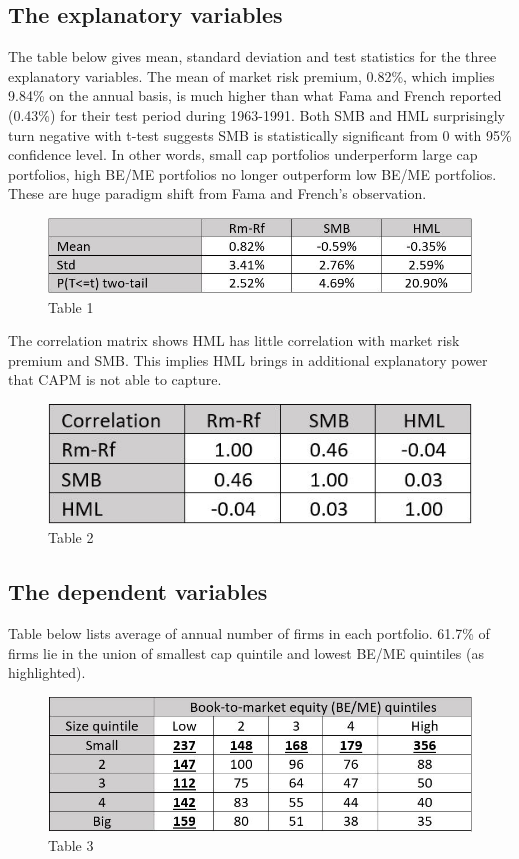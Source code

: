 \documentclass[12pt]{article}
\begin{document}
\subsection{The explanatory variables}

The table below gives mean, standard deviation and test statistics for the three explanatory variables. The mean of market risk premium, 0.82\%, which implies 9.84\% on the annual basis, is much higher than what Fama and French reported (0.43\%) for their test period during 1963-1991. Both SMB and HML surprisingly turn negative with t-test suggests SMB is statistically significant from 0 with 95\% confidence level. In other words, small cap portfolios underperform large cap portfolios, high BE/ME portfolios no longer outperform low BE/ME portfolios. These are huge paradigm shift from Fama and French’s observation.


\begin{figure}[h]
	\centering
	\includegraphics[width=0.5\linewidth]{1.JPG}
	\caption*{Table 1}
	\label{fig:label}
\end{figure}


\noindent The correlation matrix shows HML has little correlation with market risk premium and SMB. This implies HML brings in additional explanatory power that CAPM is not able to capture.

\begin{figure}[h]
	\centering
	\includegraphics[width=0.35\linewidth]{2.JPG}
	\caption*{Table 2}
	\label{fig:label}
\end{figure}


\subsection{The dependent variables}   

Table below lists average of annual number of firms in each portfolio. 61.7\% of firms lie in the union of smallest cap quintile and lowest BE/ME quintiles (as highlighted).



\begin{figure}[h]
	\centering
	\includegraphics[width=0.5\linewidth]{3.JPG}
	\caption*{Table 3}
	\label{fig:label}
\end{figure}
\end{document}
